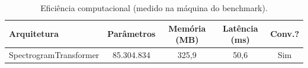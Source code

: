 \begin{table}[H]
\centering
\caption{Eficiência computacional (medido na máquina do benchmark).}
\label{tab:bench_eficiencia}
\small\singlespacing
\begin{tabular}{lcccc}
\toprule
\textbf{Arquitetura} & \textbf{Parâmetros} & \textbf{Memória (MB)} & \textbf{Latência (ms)} & \textbf{Conv.?} \\
\midrule
SpectrogramTransformer & 85.304.834 & 325,9 & 50,6 & \textcolor{successgreen}{Sim} \\
\bottomrule
\end{tabular}
\end{table}
